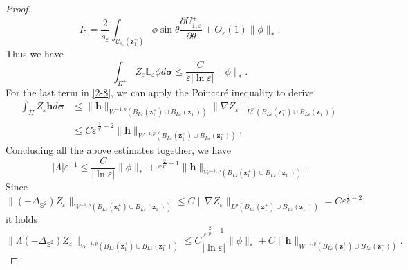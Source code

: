 \documentclass[12pt,reqno]{amsart}
\numberwithin{equation}{section}
\theoremstyle{definition}
\theoremstyle{remark}
\begin{document}
\begin{proof}
	\begin{equation*}
		I_5=\frac{2}{s_\varepsilon}\int_{\mathcal C_{s_\varepsilon}(\boldsymbol z_1^+)}\phi\sin\theta \frac{\partial U^+_{1,\varepsilon}}{\partial \theta}
		+O_\varepsilon(1)\|\phi\|_*.
	\end{equation*} 
	Thus we have
	\begin{equation*}
		\int_{\Pi^+}Z_\varepsilon\mathbb L_\varepsilon\phi d\boldsymbol \sigma\le \frac{C}{\varepsilon|\ln\varepsilon|}\|\phi\|_*.
	\end{equation*}
	For the last term in \eqref{2-8}, we can apply the Poincar\'e inequality to derive 
	\begin{align*}
		\int_{\Pi} Z_\varepsilon\mathbf h d\boldsymbol \sigma&\le \|\mathbf h\|_{W^{-1,p}(B_{L\varepsilon}(\boldsymbol z_1^+)\cup B_{L\varepsilon}(\boldsymbol z_1^-))}\|\nabla Z_\varepsilon\|_{L^{p'}(B_{L\varepsilon}(\boldsymbol z_1^+)\cup B_{L\varepsilon}(\boldsymbol z_1^-))}\\
		&\le C\varepsilon^{\frac{2}{p'}-2} \|\mathbf h\|_{W^{-1,p}(B_{L\varepsilon}(\boldsymbol z_1^+)\cup B_{L\varepsilon}(\boldsymbol z_1^-))}.
	\end{align*}
	Concluding all the above estimates together, we have
	\begin{equation*}
		|\Lambda|\varepsilon^{-1}\le\frac{C}{|\ln\varepsilon|}\|\phi\|_*+\varepsilon^{\frac{2}{p'}-1}\|\mathbf h\|_{W^{-1,p}(B_{L\varepsilon}(\boldsymbol z_1^+)\cup B_{L\varepsilon}(\boldsymbol z_1^-))}.
	\end{equation*}
	Since
	\begin{equation}\label{2-9}
		\|(-\Delta_{\mathbb S^2})Z_\varepsilon\|_{W^{-1,p}(B_{L\varepsilon}(\boldsymbol z_1^+)\cup B_{L\varepsilon}(\boldsymbol z_1^-))}\le C\|\nabla Z_\varepsilon\|_{L^{p}(B_{L\varepsilon}(\boldsymbol z_1^+)\cup B_{L\varepsilon}(\boldsymbol z_1^-))}=C \varepsilon^{\frac{2}{p}-2},
	\end{equation} 
	it holds
	\begin{equation*}
			\|\Lambda(-\Delta_{\mathbb S^2})Z_\varepsilon\|_{W^{-1,p}(B_{L\varepsilon}(\boldsymbol z_1^+)\cup B_{L\varepsilon}(\boldsymbol z_1^-))}\le C \frac{\varepsilon^{\frac{2}{p}-1}}{|\ln\varepsilon|}\|\phi\|_*+C\|\mathbf h\|_{W^{-1,p}(B_{L\varepsilon}(\boldsymbol z_1^+)\cup B_{L\varepsilon}(\boldsymbol z_1^-))}.
	\end{equation*}
	

\end{proof}
\end{document}
